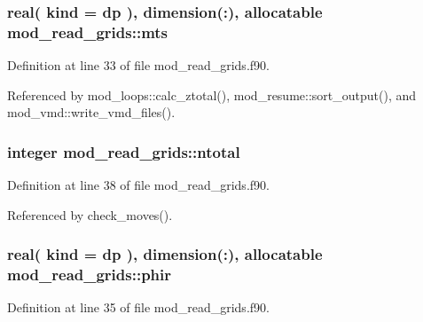 \subsubsection[{\texorpdfstring{mts}{mts}}]{\setlength{\rightskip}{0pt plus 5cm}real( kind = dp ), dimension(\+:), allocatable mod\+\_\+read\+\_\+grids\+::mts}\hypertarget{namespacemod__read__grids_af619057af0e7ce4717a95d4239422912}{}\label{namespacemod__read__grids_af619057af0e7ce4717a95d4239422912}


Definition at line 33 of file mod\+\_\+read\+\_\+grids.\+f90.



Referenced by mod\+\_\+loops\+::calc\+\_\+ztotal(), mod\+\_\+resume\+::sort\+\_\+output(), and mod\+\_\+vmd\+::write\+\_\+vmd\+\_\+files().

\subsubsection[{\texorpdfstring{ntotal}{ntotal}}]{\setlength{\rightskip}{0pt plus 5cm}integer mod\+\_\+read\+\_\+grids\+::ntotal}\hypertarget{namespacemod__read__grids_aa54b9eaa554b8519d41c5e616479d343}{}\label{namespacemod__read__grids_aa54b9eaa554b8519d41c5e616479d343}


Definition at line 38 of file mod\+\_\+read\+\_\+grids.\+f90.



Referenced by check\+\_\+moves().

\subsubsection[{\texorpdfstring{phir}{phir}}]{\setlength{\rightskip}{0pt plus 5cm}real( kind = dp ), dimension(\+:), allocatable mod\+\_\+read\+\_\+grids\+::phir}\hypertarget{namespacemod__read__grids_aa3da94e35a501dc0ed782d7019127514}{}\label{namespacemod__read__grids_aa3da94e35a501dc0ed782d7019127514}


Definition at line 35 of file mod\+\_\+read\+\_\+grids.\+f90.



